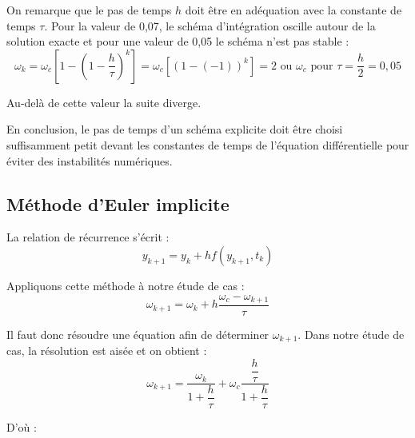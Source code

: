 \documentclass[10pt]{article}
\begin{document}
On remarque que le pas de temps $h$ doit être en adéquation avec la constante de temps $\tau$. Pour la valeur de 0,07, le schéma d’intégration oscille autour de la solution exacte et pour une valeur de 0,05 le schéma n’est pas stable :
$$\omega_k=\omega_c\left[1-\left(1-\dfrac{h}{\tau}\right)^k \right]=\omega_c[(1-(-1))^k ]=2\text{ ou }\omega_c \text{ pour } \tau=\dfrac{h}{2}=0,05 $$

Au-delà de  cette valeur la suite diverge.

En conclusion, le pas de temps d’un schéma explicite doit être choisi suffisamment petit devant les constantes de temps de l’équation différentielle pour éviter des instabilités numériques.

\subsection{Méthode d'Euler implicite}
\begin{resultat}
La relation de récurrence s’écrit : 
$$y_{k+1}=y_k+hf(y_{k+1},t_k)$$
\end{resultat}

Appliquons cette méthode à notre étude de cas :
$$\omega_{{k+1}}=\omega_{k}+h \dfrac{\omega_c-\omega_{{k+1}}}{\tau}$$

Il faut donc résoudre une équation afin de déterminer $\omega_{{k+1}}$. Dans notre étude de cas, la résolution est aisée et on obtient :
$$\omega_{{k+1}}=\dfrac{\omega_{k}}{1+\dfrac{h}{\tau}}+\omega_c \dfrac{\dfrac{h}{\tau}}{1+\dfrac{h}{\tau}}$$

D’où :
\end{document}
